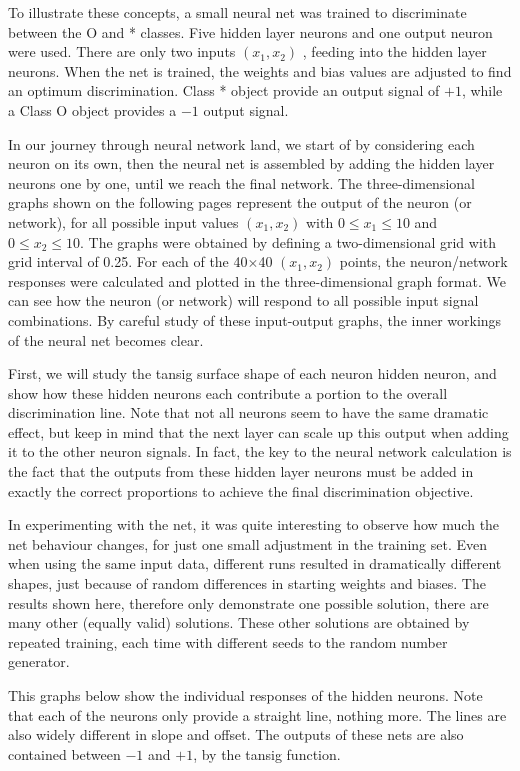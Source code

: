 To illustrate these concepts, a small neural net was trained to discriminate between the O and * classes.  Five hidden layer neurons and one output neuron were used.  There are only two inputs $(x_1,x_2)$ , feeding into the hidden layer neurons.  When the net is trained, the weights and bias values are adjusted to find an optimum discrimination.  Class * object provide an output signal of $+1$, while a Class O object provides a $-1$ output signal.  

In our journey through neural network land,  we start of by considering each neuron on its own, then the neural net is assembled by adding the hidden layer neurons one by one, until we reach the final network.    The three-dimensional graphs shown on the following pages represent the output of the neuron (or network), for all possible input values  $(x_1,x_2)$  with $0\leq x_1 \leq 10$  and  $0\leq x_2 \leq 10$.  The graphs were obtained by defining a two-dimensional grid with grid interval of 0.25.  For each of the 40$\times$40  $(x_1,x_2)$ points, the neuron/network responses were calculated and plotted in the three-dimensional graph format.   We can see how the neuron (or network) will respond to all possible input signal combinations.   By careful study of these input-output graphs, the inner workings of the neural net becomes clear.

First, we will study the tansig surface shape of each neuron hidden neuron, and show how these hidden neurons each contribute a portion to the overall discrimination line.  Note that not all neurons seem to have the same dramatic effect, but keep in mind that the next layer can scale up this output when adding it to the other neuron signals.  In fact, the key to the neural network calculation is the fact that the outputs from these hidden layer neurons must be added in exactly the correct proportions to achieve the final discrimination objective.  

In experimenting with the net, it was quite interesting to observe how much the net behaviour changes, for just one small adjustment in the training set.  Even when using the same input data, different runs resulted in dramatically different shapes, just because of random differences in starting weights and biases.  The results shown here, therefore only demonstrate one possible solution, there are many other (equally valid) solutions.  These other solutions are obtained by repeated training, each time with different seeds to the random number generator. 

 
This graphs below show the individual responses of the hidden neurons.   Note that each of the neurons only provide a straight line, nothing more.   The lines are also widely different in slope and offset.  The outputs of these nets are also contained between $-1$ and $+1$, by the tansig function.   

